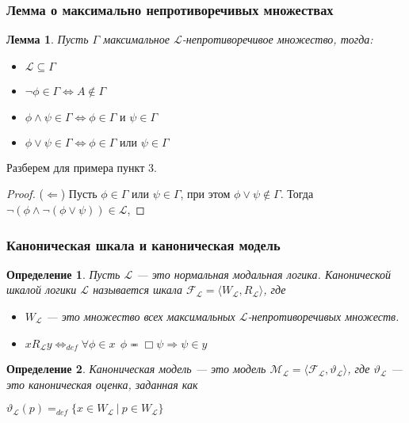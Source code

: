 \documentclass[pdf,utf8,russian,aspectratio=169]{beamer}
\newtheorem{defin}{Определение}
\newtheorem{lem}{Лемма}
\begin{document}
\begin{frame}
  \frametitle{Лемма о максимально непротиворечивых множествах}

  \begin{lem}
    Пусть $\Gamma$ максимальное $\mathcal{L}$-непротиворечивое множество, тогда:
    \begin{itemize}
      \item $\mathcal{L} \subseteq \Gamma$
      \item $\neg \phi \in \Gamma \Leftrightarrow A \notin \Gamma$
      \item $\phi \land \psi \in \Gamma \Leftrightarrow \phi \in \Gamma \text{ и } \psi \in \Gamma$
      \item $\phi \lor \psi \in \Gamma \Leftrightarrow \phi \in \Gamma \text{ или } \psi \in \Gamma$
    \end{itemize}
  \end{lem}
    Разберем для примера пункт 3.
  \begin{proof}
    ($\Leftarrow$) Пусть $\phi \in \Gamma$ или $\psi \in \Gamma$, при этом $\phi \lor \psi \notin \Gamma$. Тогда $\neg (\phi \land \neg (\phi \lor \psi)) \in \mathcal{L}$,
  \end{proof}
\end{frame}

\begin{frame}
  \frametitle{Каноническая шкала и каноническая модель}

  \begin{defin} Пусть $\mathcal{L}$ --- это нормальная модальная логика. Канонической шкалой логики $\mathcal{L}$ называется шкала
    $\mathcal{F}_{\mathcal{L}} = \langle W_{\mathcal{L}}, R_{\mathcal{L}}\rangle$, где
    \begin{itemize}
      \item $W_{\mathcal{L}}$ --- это множество всех максимальных $\mathcal{L}$-непротиворечивых множеств.
      \item $x R_{\mathcal{L}} y \Leftrightarrow_{def} \forall \phi \in x \:\: \phi \eqcirc \Box \psi \Rightarrow \psi \in y$
    \end{itemize}
  \end{defin}

  \begin{defin}
    Каноническая модель --- это модель $\mathcal{M}_{\mathcal{L}} = \langle \mathcal{F}_{\mathcal{L}}, \vartheta_{\mathcal{L}} \rangle$,
    где $\vartheta_{\mathcal{L}}$ --- это каноническая оценка, заданная как

    \begin{center}
      $\vartheta_{\mathcal{L}}(p) =_{def} \{ x \in W_{\mathcal{L}} \: | \: p \in W_{\mathcal{L}} \}$
    \end{center}
  \end{defin}
\end{frame}
\end{document}
